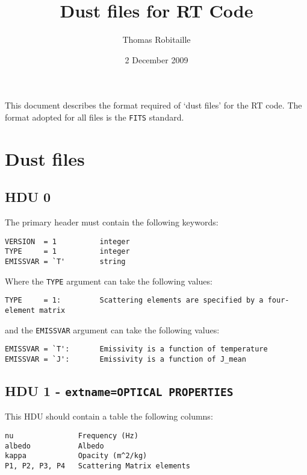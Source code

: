 \documentclass[11pt]{article}
\begin{document}
\title{Dust files for RT Code}
\author{Thomas Robitaille}
\date{2 December 2009}
\maketitle

This document describes the format required of `dust files' for the RT code. The format adopted for all files is the \texttt{FITS} standard.

\section{Dust files}

\subsection{HDU 0}

The primary header must contain the following keywords:

\begin{verbatim}
VERSION  = 1          integer
TYPE     = 1          integer
EMISSVAR = `T'        string
\end{verbatim}

Where the \texttt{TYPE} argument can take the following values:

\begin{verbatim}
TYPE     = 1:         Scattering elements are specified by a four-element matrix
\end{verbatim}

and the \texttt{EMISSVAR} argument can take the following values:

\begin{verbatim}
EMISSVAR = `T':       Emissivity is a function of temperature
EMISSVAR = `J':       Emissivity is a function of J_mean
\end{verbatim}

\subsection{HDU 1 - \texttt{extname=OPTICAL PROPERTIES}}

This HDU should contain a table the following columns:

\begin{verbatim}
nu               Frequency (Hz)
albedo           Albedo
kappa            Opacity (m^2/kg)
P1, P2, P3, P4   Scattering Matrix elements
\end{verbatim}
\end{document}
